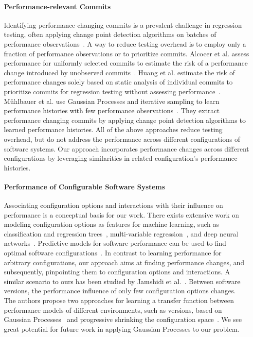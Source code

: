 \documentclass[sigconf]{acmart}
\begin{document}
	\paragraph{Performance-relevant Commits} Identifying performance-changing commits is a prevalent challenge in regression testing, often applying change point detection algorithms on batches of performance observations~\cite{cityIdentifying2014,daly_industry_2020}. A way to reduce testing overhead is to employ only a fraction of performance observations or to prioritize commits. Alcocer et al. assess performance for uniformly selected commits to estimate the risk of a performance change introduced by unobserved commits~\cite{sandoval_alcocer_learning_2016,alcocer_prioritizing_2020}. Huang et al. estimate the risk of performance changes solely based on static analysis of individual commits to prioritize commits for regression testing without assessing performance~\cite{huang_performance_2014}. Mühlbauer et al. use Gaussian Processes and iterative sampling to learn performance histories with few performance observations~\cite{muhlbauer_accurate_2019}. They extract performance changing commits by applying change point detection algorithms to learned performance histories. All of the above approaches reduce testing overhead, but do not address the performance across different configurations of software systems. Our approach incorporates performance changes across different configurations by leveraging similarities in related configuration's performance histories.
	
	\paragraph{Performance of Configurable Software Systems} Associating configuration options and interactions with their influence on performance is a conceptual basis for our work. There exists extensive work on modeling configuration options as features for machine learning, such as classification and regression trees~\cite{guo_2018_data,guoVariabilityawarePerformancePrediction2013,sarkarCostEfficientSamplingPerformance,nairUsingBadLearners2017}, multi-variable regression~\cite{siegmundPerformanceinfluenceModelsHighly2015}, and deep neural networks~\cite{haDeepPerf2019}. Predictive models for software performance can be used to find optimal software configurations~\cite{nairFlash18}.
	In contrast to learning performance for arbitrary configurations, our approach aims at finding  performance changes, and subsequently, pinpointing them to configuration options and interactions.
	A similar scenario to ours has been studied by Jamshidi et al.~\cite{jamishidi_transfer_2017,jamshidi_transfer_gp_2017,jamshidi_learning_2018}. Between software versions, the performance influence of only few configuration options changes. The authors propose two approaches for learning a transfer function between performance models of different environments, such as versions, based on Gaussian Processes~\cite{jamshidi_transfer_gp_2017} and progressive shrinking the configuration space~\cite{jamshidi_learning_2018}. We see great potential for future work in applying Gaussian Processes to our problem.
	
\end{document}
